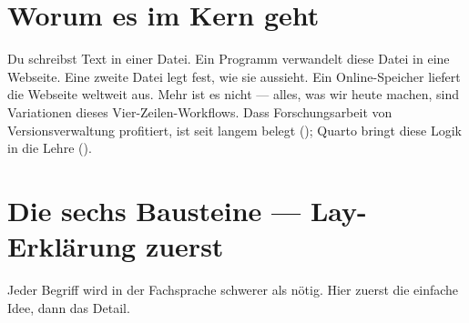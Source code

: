 \documentclass[
  ngerman,
  a4paper,
  DIV=11]{scrreprt}
\begin{document}
\section{Worum es im Kern geht}\label{worum-es-im-kern-geht}

Du schreibst Text in einer Datei. Ein Programm verwandelt diese Datei in
eine Webseite. Eine zweite Datei legt fest, wie sie aussieht. Ein
Online-Speicher liefert die Webseite weltweit aus. Mehr ist es nicht ---
alles, was wir heute machen, sind Variationen dieses
Vier-Zeilen-Workflows. Dass Forschungsarbeit von Versionsverwaltung
profitiert, ist seit langem belegt (); Quarto bringt diese Logik in die Lehre
().

\section{Die sechs Bausteine --- Lay-Erklärung
zuerst}\label{die-sechs-bausteine-lay-erkluxe4rung-zuerst}

Jeder Begriff wird in der Fachsprache schwerer als nötig. Hier zuerst
die einfache Idee, dann das Detail.
\end{document}
